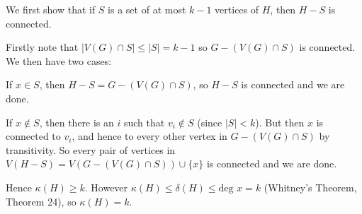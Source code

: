 We first show that if $S$ is a set of at most $k-1$ vertices
of $H$, then $H-S$ is connected.

Firstly note that $|V(G)\cap S| \le |S| = k-1$ so $G- (V(G)\cap S)$
is connected. We then have two cases:

If $x \in S$, then $H-S=G-(V(G)\cap S)$, so $H-S$ is connected and we
are done.

If $x \notin S$, then there is an $i$ such that $v_i \notin S$ (since
$|S|<k$). But then $x$ is connected to $v_i$, and hence to every other
vertex in $G-(V(G)\cap S)$ by transitivity. So every pair of vertices in
$V(H-S) = V(G-(V(G)\cap S))\cup\{x\}$ is connected and we are done.

Hence $\kappa(H) \ge k$. However 
$\kappa(H) \le \delta(H) \le \text{deg } x =k$ 
(Whitney's Theorem, \cite{notes} Theorem 24), so $\kappa(H) = k$.

